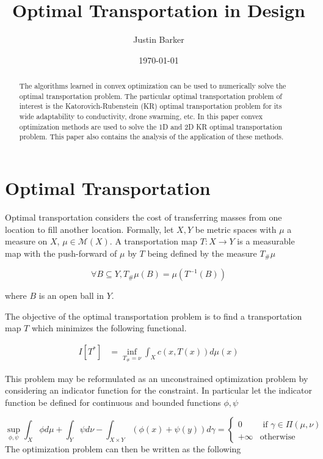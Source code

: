 \documentclass[12pt]{article}
\title{Optimal Transportation in Design}
\date{\today}
\author{Justin Barker}
\begin{document}
\maketitle

\begin{abstract}
The algorithms learned in convex optimization can be used to numerically solve the optimal transportation problem. The particular optimal transportation problem of interest is the Katorovich-Rubenstein (KR) optimal transportation problem for its wide adaptability to conductivity, drone swarming, etc. In this paper convex optimization methods are used to solve the 1D and 2D KR optimal transportation problem. This paper also contains the analysis of the application of these methods.
\end{abstract}


\medskip

\section{Optimal Transportation}
Optimal transportation considers the cost of transferring masses from one location to fill another location. Formally, let $X,Y$ be metric spaces with $\mu$ a measure on $X$, $\mu\in\mathcal{M}(X)$. A transportation map $T:X\rightarrow Y$ is a measurable map with the push-forward of $\mu$ by $T$ being defined by the measure $T_\#\mu$

$$\forall B\subseteq Y, T_\#\mu(B)=\mu(T^{-1}(B))$$

\noindent where $B$ is an open ball in $Y$.

The objective of the optimal transportation problem is to find a transportation map $T$ which  minimizes the following functional.

\begin{align}
I[T^*]&=\inf_{T_\#=\nu} \int_{X}c(x,T(x))d\mu(x) \label{eq1}\tag{1}
\end{align}

This problem may be reformulated as an unconstrained optimization problem by considering an indicator function for the constraint. In particular let the indicator function be defined for continuous and bounded functions $\phi,\psi$

$$\sup_{\phi,\psi} \int_X\phi d\mu + \int_Y\psi d\nu - \int_{X\times Y} \left(\phi(x)+\psi(y)\right)d\gamma = \begin{cases} 0 & \text{ if }\gamma\in\Pi(\mu,\nu)\\ +\infty & \text{otherwise}\end{cases}$$
\noindent
The  optimization problem can then be written as the following 
\end{document}
